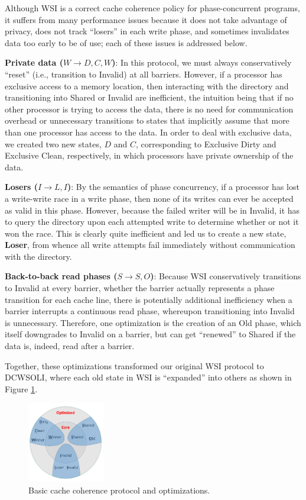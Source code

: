 \documentclass{article}
\begin{document}
Although WSI is a correct cache coherence policy for phase-concurrent programs, it suffers from many performance issues because it does not take advantage of privacy, does not track ``losers'' in each write phase, and sometimes invalidates data too early to be of use; each of these issues is addressed below.

\textbf{Private data ($W \rightarrow D, C, W$)}:
In this protocol, we must always conservatively ``reset'' (i.e., transition to Invalid) at all barriers. However, if a processor has exclusive access to a memory location, then interacting with the directory and transitioning into Shared or Invalid are inefficient, the intuition being that if no other processor is trying to access the data, there is no need for communication overhead or unnecessary transitions to states that implicitly assume that more than one processor has access to the data. In order to deal with exclusive data, we created two new states, $D$ and $C$, corresponding to Exclusive Dirty and Exclusive Clean, respectively, in which processors have private ownership of the data.

\textbf{Losers ($I \rightarrow L, I$)}: 
By the semantics of phase concurrency, if a processor has lost a write-write race in a write phase, then none of its writes can ever be accepted as valid in this phase. However, because the failed writer will be in Invalid, it has to query the directory upon each attempted write to determine whether or not it won the race. This is clearly quite inefficient and led us to create a new state, \textbf{Loser}, from whence all write attempts fail immediately without communication with the directory.

\textbf{Back-to-back read phases ($S \rightarrow S, O$)}:
Because WSI conservatively transitions to Invalid at every barrier, whether the barrier actually represents a phase transition for each cache line, there is potentially additional inefficiency when a barrier interrupts a continuous read phase, whereupon transitioning into Invalid is unnecessary. Therefore, one optimization is the creation of an Old phase, which itself downgrades to Invalid on a barrier, but can get ``renewed'' to Shared if the data is, indeed, read after a barrier.

Together, these optimizations transformed our original WSI protocol to DCWSOLI, where each old state in WSI is ``expanded'' into others as shown in Figure \ref{wsi-to-dcwsoli}.

\begin{figure}[H]
\centering
\includegraphics[width=0.3\textwidth]{img/posterfig2.png}
\caption{Basic cache coherence protocol and optimizations.}
\label{wsi-to-dcwsoli}
\end{figure}
\end{document}
